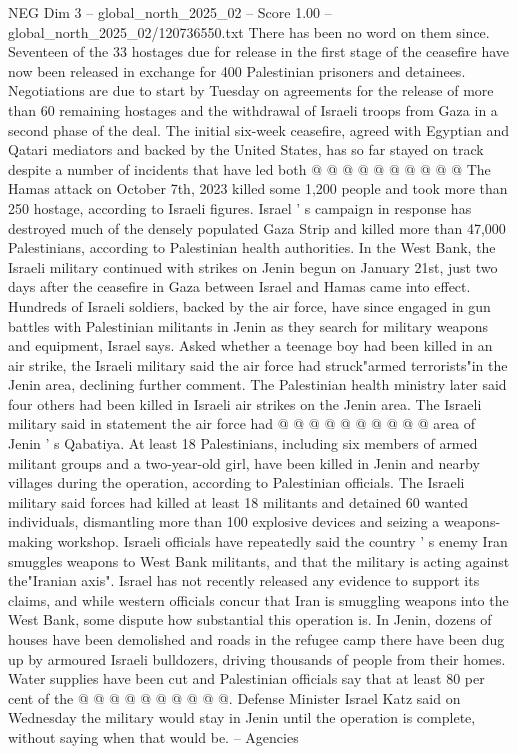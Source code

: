 \begin{textsample}{NEG Dim 3 – global\_north\_2025\_02 – Score 1.00 – global\_north\_2025\_02/120736550.txt}
There has been no word on them since.
Seventeen of the 33 hostages due for release in the first stage of the ceasefire have now been released in exchange for 400 Palestinian prisoners and detainees.
Negotiations are due to start by Tuesday on agreements for the release of more than 60 remaining hostages and the withdrawal of Israeli troops from Gaza in a second phase of the deal.
The initial six-week ceasefire, agreed with Egyptian and Qatari mediators and backed by the United States, has so far stayed on track despite a number of incidents that have led both @ @ @ @ @ @ @ @ @ @ The Hamas attack on October 7th, 2023 killed some 1,200 people and took more than 250 hostage, according to Israeli figures.
Israel ' s campaign in response has destroyed much of the densely populated Gaza Strip and killed more than 47,000 Palestinians, according to Palestinian health authorities.
In the West Bank, the Israeli military continued with strikes on Jenin begun on January 21st, just two days after the ceasefire in Gaza between Israel and Hamas came into effect.
Hundreds of Israeli soldiers, backed by the air force, have since engaged in gun battles with Palestinian militants in Jenin as they search for military weapons and equipment, Israel says.
Asked whether a teenage boy had been killed in an air strike, the Israeli military said the air force had struck"armed terrorists"in the Jenin area, declining further comment.
The Palestinian health ministry later said four others had been killed in Israeli air strikes on the Jenin area.
The Israeli military said in statement the air force had @ @ @ @ @ @ @ @ @ @ area of Jenin ' s Qabatiya.
At least 18 Palestinians, including six members of armed militant groups and a two-year-old girl, have been killed in Jenin and nearby villages during the operation, according to Palestinian officials.
The Israeli military said forces had killed at least 18 militants and detained 60 wanted individuals, dismantling more than 100 explosive devices and seizing a weapons-making workshop.
Israeli officials have repeatedly said the country ' s enemy Iran smuggles weapons to West Bank militants, and that the military is acting against the"Iranian axis".
Israel has not recently released any evidence to support its claims, and while western officials concur that Iran is smuggling weapons into the West Bank, some dispute how substantial this operation is.
In Jenin, dozens of houses have been demolished and roads in the refugee camp there have been dug up by armoured Israeli bulldozers, driving thousands of people from their homes.
Water supplies have been cut and Palestinian officials say that at least 80 per cent of the @ @ @ @ @ @ @ @ @ @.
Defense Minister Israel Katz said on Wednesday the military would stay in Jenin until the operation is complete, without saying when that would be. -- Agencies

\end{textsample}
